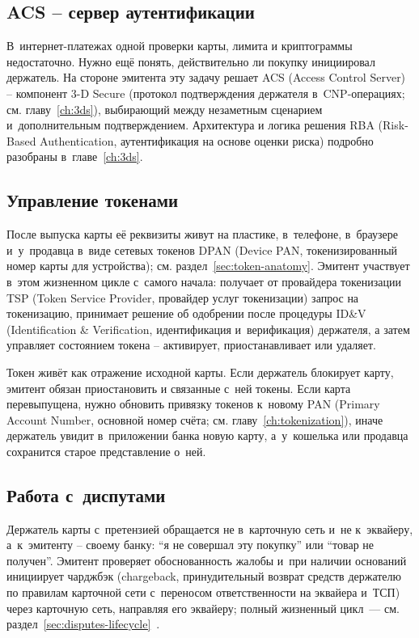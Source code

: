 \subsection*{ACS -- сервер аутентификации}

В~интернет-платежах одной проверки карты, лимита и криптограммы
недостаточно. Нужно ещё понять, действительно ли покупку
инициировал держатель. На стороне эмитента эту задачу решает ACS
(Access Control Server) -- компонент 3-D Secure (протокол
подтверждения держателя в~CNP-операциях; см. главу~\ref{ch:3ds}),
выбирающий между незаметным сценарием и~дополнительным
подтверждением. Архитектура и логика решения RBA (Risk-Based
Authentication, аутентификация на основе оценки риска) подробно
разобраны в~главе~\ref{ch:3ds}.

\subsection*{Управление токенами}

После выпуска карты её реквизиты живут на пластике, в~телефоне,
в~браузере и~у~продавца в~виде сетевых токенов DPAN (Device PAN,
токенизированный номер карты для устройства); см.
раздел~\ref{sec:token-anatomy}. Эмитент участвует в~этом
жизненном цикле с~самого начала: получает от провайдера токенизации
TSP (Token Service Provider, провайдер услуг токенизации) запрос на
токенизацию, принимает решение об одобрении после
процедуры ID\&V (Identification \& Verification, идентификация
и~верификация) держателя, а
затем управляет состоянием токена -- активирует, приостанавливает
или удаляет.~\cite{emvco-payment-tokenisation,visa-vts,nspk-tsp}

Токен живёт как отражение исходной карты. Если держатель блокирует
карту, эмитент обязан приостановить и связанные с~ней токены. Если
карта перевыпущена, нужно обновить привязку токенов к~новому PAN
(Primary Account Number, основной номер счёта; см. главу~\ref{ch:tokenization}),
иначе держатель увидит в~приложении банка новую карту, а~у~кошелька
или продавца сохранится старое представление о~ней.~\cite{emvco-payment-tokenisation,visa-vts}

\subsection*{Работа с~диспутами}

Держатель карты с~претензией обращается не в~карточную сеть и~не
к~эквайеру, а~к~эмитенту -- своему банку: \enquote{я не совершал
эту покупку} или \enquote{товар не получен}. Эмитент проверяет
обоснованность жалобы и~при наличии оснований инициирует чарджбэк
(chargeback, принудительный возврат средств держателю по правилам
карточной сети с~переносом ответственности на эквайера и~ТСП) через
карточную сеть, направляя его эквайеру; полный жизненный цикл~---
см. раздел~\ref{sec:disputes-lifecycle}~\cite{visa-core-rules,mc-chargeback-guide,visa-vcr-merchants}.

